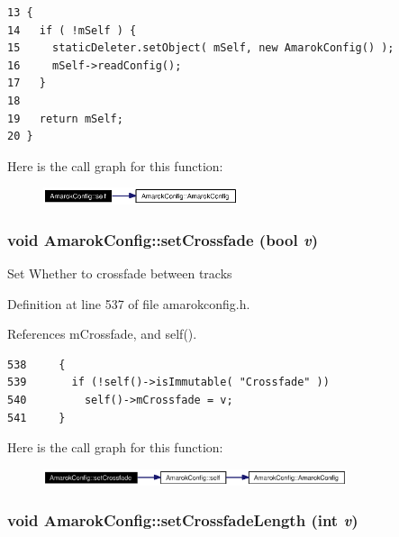 \footnotesize\begin{verbatim}13 {
14   if ( !mSelf ) {
15     staticDeleter.setObject( mSelf, new AmarokConfig() );
16     mSelf->readConfig();
17   }
18 
19   return mSelf;
20 }
\end{verbatim}\normalsize 


Here is the call graph for this function:\begin{figure}[H]
\begin{center}
\leavevmode
\includegraphics[width=162pt]{classAmarokConfig_AmarokConfige0_cgraph}
\end{center}
\end{figure}
\subsubsection{\setlength{\rightskip}{0pt plus 5cm}void Amarok\-Config::set\-Crossfade (bool {\em v})\hspace{0.3cm}{\tt  [inline, static]}}\label{classAmarokConfig_AmarokConfige55}


Set Whether to crossfade between tracks 

Definition at line 537 of file amarokconfig.h.

References m\-Crossfade, and self().



\footnotesize\begin{verbatim}538     {
539       if (!self()->isImmutable( "Crossfade" ))
540         self()->mCrossfade = v;
541     }
\end{verbatim}\normalsize 


Here is the call graph for this function:\begin{figure}[H]
\begin{center}
\leavevmode
\includegraphics[width=253pt]{classAmarokConfig_AmarokConfige55_cgraph}
\end{center}
\end{figure}
\subsubsection{\setlength{\rightskip}{0pt plus 5cm}void Amarok\-Config::set\-Crossfade\-Length (int {\em v})\hspace{0.3cm}{\tt  [inline, static]}}\label{classAmarokConfig_AmarokConfige57}


